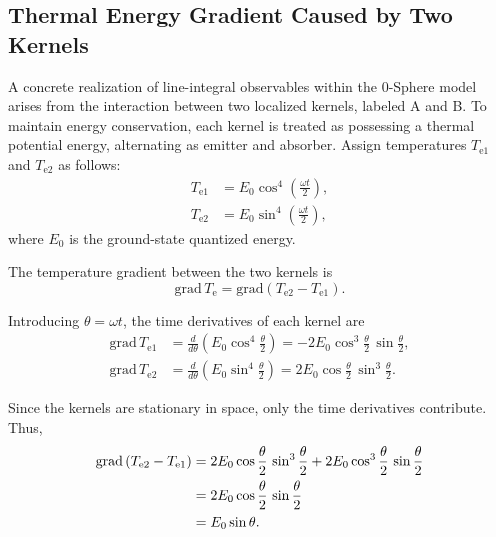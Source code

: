 \documentclass[%
 reprint,
 amsmath,amssymb,
 aps,
 prb,
]{revtex4-2}
\numberwithin{equation}{section}
\begin{document}
\subsection{Thermal Energy Gradient Caused by Two Kernels}
\label{sec:thermal_geodesic_equation}

A concrete realization of line-integral observables within the 0-Sphere model arises from the interaction between two localized kernels, labeled A and B. To maintain energy conservation, each kernel is treated as possessing a thermal potential energy, alternating as emitter and absorber. Assign temperatures $T_{\mathrm{e1}}$ and $T_{\mathrm{e2}}$ as follows:
\begin{equation}
\begin{split}
T_{\mathrm{e1}} &= E_0 \cos^4 \left( \frac{\omega t}{2} \right), \\
T_{\mathrm{e2}} &= E_0 \sin^4 \left( \frac{\omega t}{2} \right),
\end{split}
\label{eq:Te1Te2}
\end{equation}
where $E_0$ is the ground-state quantized energy.

The temperature gradient between the two kernels is
\begin{equation}
\mathrm{grad} \, T_\mathrm{e} = \mathrm{grad} \left( T_{\mathrm{e2}} - T_{\mathrm{e1}} \right).
\label{eq:grad_Te}
\end{equation}

Introducing $\theta = \omega t$, the time derivatives of each kernel are
\begin{align}
\mathrm{grad} \, T_{\mathrm{e1}} &= \frac{d}{d\theta} \left( E_0 \cos^4 \frac{\theta}{2} \right) = -2 E_0 \cos^3 \frac{\theta}{2} \, \sin \frac{\theta}{2}, \\
\mathrm{grad} \, T_{\mathrm{e2}} &= \frac{d}{d\theta} \left( E_0 \sin^4 \frac{\theta}{2} \right) = 2 E_0 \cos \frac{\theta}{2} \, \sin^3 \frac{\theta}{2}.
\end{align}

Since the kernels are stationary in space, only the time derivatives contribute. Thus,
\begin{align}
\mathrm{grad} \left( T_{\mathrm{e2}} - T_{\mathrm{e1}} \right)
&= 2 E_0 \cos \frac{\theta}{2} \, \sin^3 \frac{\theta}{2} + 2 E_0 \cos^3 \frac{\theta}{2} \, \sin \frac{\theta}{2} \notag \\
&= 2 E_0 \cos \frac{\theta}{2} \, \sin \frac{\theta}{2} \notag \\
&= E_0 \sin \theta.
\label{eq:thermal_grad_final}
\end{align}
\end{document}

